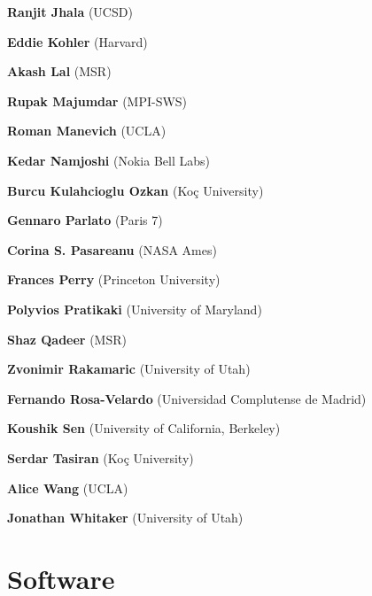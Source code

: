 \documentclass{article}
\begin{document}
\begin{commalist}
    \item {\bf Ranjit Jhala} (UCSD)


    \item {\bf Eddie Kohler} (Harvard)


    \item {\bf Akash Lal} (MSR)


    \item {\bf Rupak Majumdar} (MPI-SWS)


    \item {\bf Roman Manevich} (UCLA)


    \item {\bf Kedar Namjoshi} (Nokia Bell Labs)


    \item {\bf Burcu Kulahcioglu Ozkan} (Koç University)


    \item {\bf Gennaro Parlato} (Paris 7)


    \item {\bf Corina S. Pasareanu} (NASA Ames)


    \item {\bf Frances Perry} (Princeton University)


    \item {\bf Polyvios Pratikaki} (University of Maryland)


    \item {\bf Shaz Qadeer} (MSR)


    \item {\bf Zvonimir Rakamaric} (University of Utah)


    \item {\bf Fernando Rosa-Velardo} (Universidad Complutense de Madrid)


    \item {\bf Koushik Sen} (University of California, Berkeley)


    \item {\bf Serdar Tasiran} (Koç University)


    \item {\bf Alice Wang} (UCLA)


    \item {\bf Jonathan Whitaker} (University of Utah)

  \end{commalist}

  \section*{Software}
\end{document}
